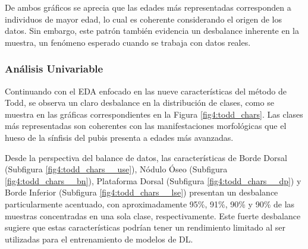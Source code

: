 De ambos gráficos se aprecia que las edades más representadas corresponden a individuos de mayor edad, lo cual es coherente considerando el origen de los datos. Sin embargo, este patrón también evidencia un desbalance inherente en la muestra, un fenómeno esperado cuando se trabaja con datos reales.

\subsubsection{Análisis Univariable}
Continuando con el EDA enfocado en las nueve características del método de Todd, se observa un claro desbalance en la distribución de clases, como se muestra en las gráficas correspondientes en la Figura \ref{fig4:todd_chars}. Las clases más representadas son coherentes con las manifestaciones morfológicas que el hueso de la sínfisis del pubis presenta a edades más avanzadas.

Desde la perspectiva del balance de datos, las características de Borde Dorsal (Subfigura \ref{fig4:todd_chars__use}), Nódulo Óseo (Subfigura \ref{fig4:todd_chars__bn}), Plataforma Dorsal (Subfigura \ref{fig4:todd_chars__dp}) y Borde Inferior (Subfigura \ref{fig4:todd_chars__lse}) presentan un desbalance particularmente acentuado, con aproximadamente 95\%, 91\%, 90\% y 90\% de las muestras concentradas en una sola clase, respectivamente. Este fuerte desbalance sugiere que estas características podrían tener un rendimiento limitado al ser utilizadas para el entrenamiento de modelos de DL.

